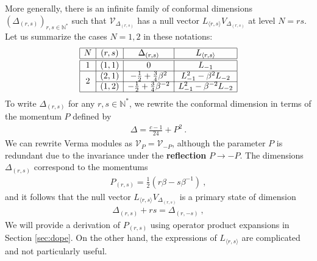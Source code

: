 \documentclass[12pt, a4paper]{article}
\theoremstyle{break}
\begin{document}
More generally, there is an infinite family of conformal dimensions $(\Delta_{(r, s)})_{r,s\in\mathbb{N}^*}$ such that $\mathcal{V}_{\Delta_{(r, s)}}$ has a null vector $L_{\langle r,s\rangle} V_{\Delta_{(r, s)}}$ at level $N=rs$. Let us summarize the cases $N=1,2$ in these notations:
\begin{align}
\begin{array}{|c|c|c|c|}
\hline 
N & (r, s) & \Delta_{(r, s)} &  L_{\langle r,s\rangle} 
\\
\hline\hline
1 & (1, 1) & 0 &  L_{-1}
\\
\hline
\multirow{2}{*}{2} & 
(2, 1) & -\frac12 + \frac34 \beta^{2}  & L_{-1}^2 -\beta^{2} L_{-2}
\\
\cline{2-4}
& (1, 2) & -\frac12 + \frac34 \beta^{-2} & L_{-1}^2 -\beta^{-2} L_{-2} 
\\
\hline
\end{array}
\label{ars}
\end{align}
To write $\Delta_{(r, s)}$ for any $r,s\in\mathbb{N}^*$, we rewrite the conformal dimension in terms of the momentum $P$ defined by 
\begin{align}
 \boxed{\Delta = \frac{c-1}{24} + P^2}\ .
 \label{dp}
\end{align}
We can rewrite Verma modules as $\mathcal{V}_P=\mathcal{V}_{-P}$, although the parameter $P$ is redundant due to the invariance under the \textbf{reflection} $P\to -P$. The dimensions $\Delta_{(r, s)}$ correspond to the momentums 
\begin{align}
 \boxed{P_{(r, s)} = \frac12\left(r\beta -s\beta^{-1}\right)}\ ,
 \label{prs}
\end{align}
and it follows that the null vector $L_{\langle r,s\rangle} V_{\Delta_{(r, s)}}$ is a primary state of dimension
\begin{align}
 \Delta_{(r, s)} + rs = \Delta_{(r, -s)}\ , 
 \label{drms}
\end{align}
We will provide a derivation of $P_{(r, s)}$ using operator product expansions in Section \ref{sec:dope}. On the other hand, the expressions of $L_{\langle r,s\rangle} $ are complicated and not particularly useful. 
\end{document}
